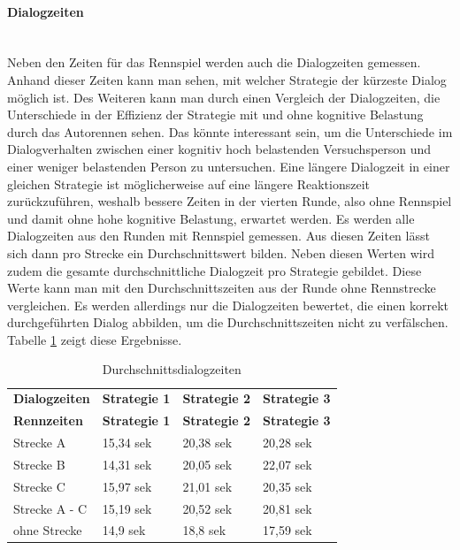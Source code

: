 \documentclass[12pt,a4paper]{scrartcl}
\begin{document}
\paragraph{Dialogzeiten}
~\\
Neben den Zeiten für das Rennspiel werden auch die Dialogzeiten gemessen. Anhand dieser Zeiten kann man sehen, mit welcher Strategie der kürzeste Dialog möglich ist. Des Weiteren kann man durch einen Vergleich der Dialogzeiten, die Unterschiede in der Effizienz der Strategie mit und ohne kognitive Belastung durch das Autorennen sehen. Das könnte interessant sein, um die Unterschiede im Dialogverhalten zwischen einer kognitiv hoch belastenden Versuchsperson und einer weniger belastenden Person zu untersuchen. Eine längere Dialogzeit in einer gleichen Strategie ist möglicherweise auf eine längere Reaktionszeit zurückzuführen, weshalb bessere Zeiten in der vierten Runde, also ohne Rennspiel und damit ohne hohe kognitive Belastung, erwartet werden. Es werden alle Dialogzeiten aus den Runden mit Rennspiel gemessen. Aus diesen Zeiten lässt sich dann pro Strecke ein Durchschnittswert bilden. Neben diesen Werten wird zudem die gesamte durchschnittliche Dialogzeit pro Strategie gebildet. Diese Werte kann man mit den Durchschnittszeiten aus der Runde ohne Rennstrecke vergleichen. Es werden allerdings nur die Dialogzeiten bewertet, die einen korrekt durchgeführten Dialog abbilden, um die Durchschnittszeiten nicht zu verfälschen.  Tabelle \ref{Durchschnittsdialogzeiten1} zeigt diese Ergebnisse.

\begin{longtable}{p{3cm}p{3cm}p{3cm}p{3cm} }
	\label{Durchschnittsdialogzeiten1}\\
	\caption[Durchschnittsdialogzeiten]{Durchschnittsdialogzeiten}\\
	\hline
	\textbf{Dialogzeiten}&\textbf{Strategie 1}&\textbf{Strategie 2} &\textbf{Strategie 3}\\
	\hline
	\endfirsthead
	\hline
	\textbf{Rennzeiten}&\textbf{Strategie 1}&\textbf{Strategie 2} &\textbf{Strategie 3}\\
	\hline
	\endhead
Strecke A & 15,34 sek & 20,38 sek & 20,28 sek \\
Strecke B & 14,31 sek & 20,05 sek & 22,07 sek \\
Strecke C  & 15,97 sek & 21,01 sek & 20,35 sek \\
\hline
\hline
Strecke A - C & 15,19 sek & 20,52 sek & 20,81 sek \\
\hline
ohne Strecke &  14,9 sek & 18,8 sek & 17,59 sek \\
\hline
\end{longtable}
\end{document}
